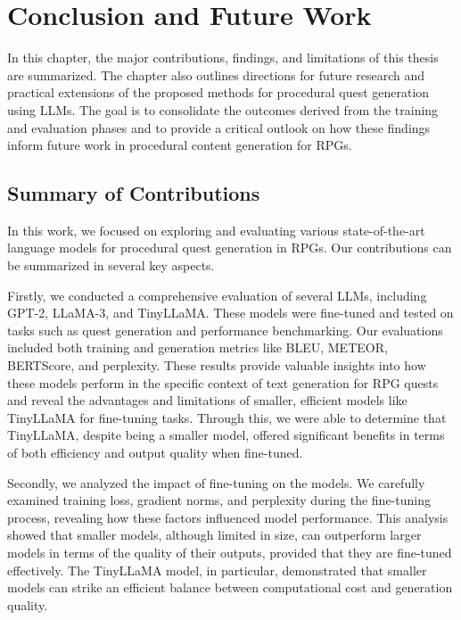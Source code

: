 \clearpage

\chapter{Conclusion and Future Work}

In this chapter, the major contributions, findings, and limitations of this thesis are summarized.
The chapter also outlines directions for future research and practical extensions
of the proposed methods for procedural quest generation using LLMs. The goal is to consolidate
the outcomes derived from the training and evaluation phases and to provide a
critical outlook on how these findings inform future work in procedural content generation
for RPGs.

\section{Summary of Contributions}

In this work, we focused on exploring and evaluating various state-of-the-art language
models for procedural quest generation in RPGs. Our contributions can be summarized
in several key aspects.

Firstly, we conducted a comprehensive evaluation of several LLMs, including GPT-2,
LLaMA-3, and TinyLLaMA. These models were fine-tuned and tested on tasks such as
quest generation and performance benchmarking. Our evaluations included both training
and generation metrics like BLEU, METEOR, BERTScore, and perplexity. These results
provide valuable insights into how these models perform in the specific context of text
generation for RPG quests and reveal the advantages and limitations of smaller, efficient
models like TinyLLaMA for fine-tuning tasks. Through this, we were able to determine
that TinyLLaMA, despite being a smaller model, offered significant benefits in terms of
both efficiency and output quality when fine-tuned.

Secondly, we analyzed the impact of fine-tuning on the models. We carefully examined
training loss, gradient norms, and perplexity during the fine-tuning process, revealing how
these factors influenced model performance. This analysis showed that smaller models,
although limited in size, can outperform larger models in terms of the quality of their outputs,
provided that they are fine-tuned effectively. The TinyLLaMA model, in particular,
demonstrated that smaller models can strike an efficient balance between computational
cost and generation quality.

